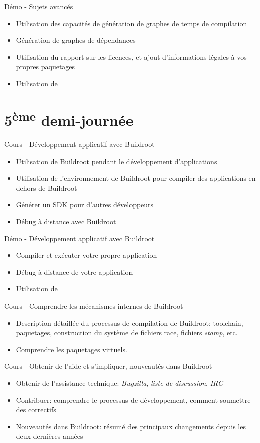 \documentclass[a4paper,12pt,obeyspaces,spaces,hyphens]{article}
\begin{document}
\feagendaonecolumn
{Démo - Sujets avancés}
{
  \begin{itemize}
  \item Utilisation des capacités de génération de graphes de temps de
	compilation
  \item Génération de graphes de dépendances
  \item Utilisation du rapport sur les licences, et ajout d'informations
	légales à vos propres paquetages
  \item Utilisation de 
  \end{itemize}
}

\section{5\textsuperscript{ème} demi-journée}

\feagendatwocolumn
{Cours - Développement applicatif avec Buildroot}
{
  \begin{itemize}
  \item Utilisation de Buildroot pendant le développement d'applications
  \item Utilisation de l'environnement de Buildroot pour compiler des
	applications en dehors de Buildroot
  \item Générer un SDK pour d'autres développeurs
  \item Débug à distance avec Buildroot
  \end{itemize}
}
{Démo - Développement applicatif avec Buildroot}
{
  \begin{itemize}
  \item Compiler et exécuter votre propre application
  \item Débug à distance de votre application
  \item Utilisation de 
  \end{itemize}
}

\feagendatwocolumn
{Cours - Comprendre les mécanismes internes de Buildroot}
{
  \begin{itemize}
  \item Description détaillée du processus de compilation de Buildroot:
    	toolchain, paquetages, construction du système de fichiers race,
	fichiers {\em stamp}, etc.
  \item Comprendre les paquetages virtuels.
  \end{itemize}
}
{Cours - Obtenir de l'aide et s'impliquer, nouveautés dans Buildroot}
{
  \begin{itemize}
  \item Obtenir de l'assistance technique: {\em Bugzilla}, {\em liste de
	discussion}, {\em IRC}
  \item Contribuer: comprendre le processus de développement, comment
    soumettre des correctifs
  \item Nouveautés dans Buildroot: résumé des principaux changements
    depuis les deux dernières années
  \end{itemize}
}
\end{document}
